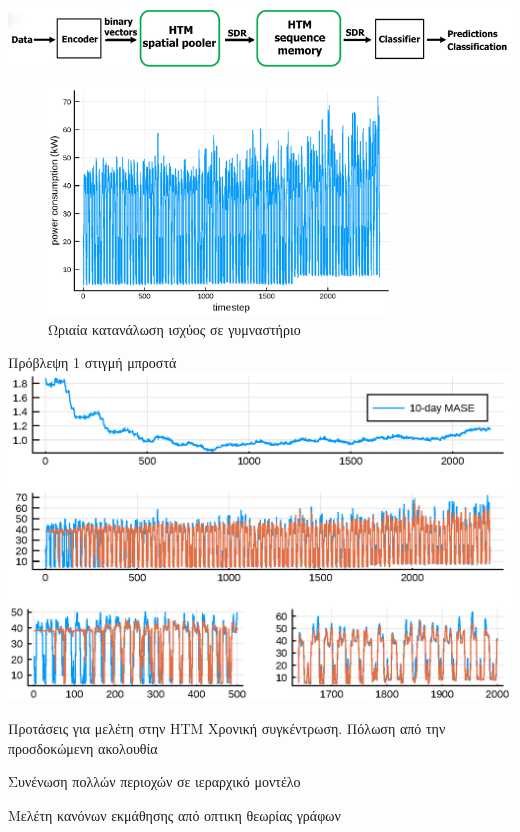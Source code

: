 \documentclass[10pt,lualatex]{beamer}
\begin{document}
\begin{frame}
  \centering
  \includegraphics[width=\textwidth]{../figures/htm_predict_pipeline}
  \pause
  \begin{figure}
    \includegraphics[width=\textwidth,height=6cm]{../figures/tshotgym}
    \caption{Ωριαία κατανάλωση ισχύος σε γυμναστήριο}
  \end{figure}
\end{frame}

\begin{frame}{Πρόβλεψη 1 στιγμή μπροστά}
  \centering
  \includegraphics[width=\textwidth]{../figures/tm1.eps}
\end{frame}

\begin{frame}{Προτάσεις για μελέτη στην HTM}
    \alert{Χρονική συγκέντρωση}. Πόλωση από την προσδοκώμενη ακολουθία \cite{hawkinsTheoryHowColumns2017}

    Συνένωση πολλών περιοχών σε \alert{ιεραρχικό μοντέλο} \cite{hawkinsFrameworkIntelligenceCortical2019}

		Μελέτη κανόνων εκμάθησης από οπτικη \alert{θεωρίας γράφων} \cite{kipouridisConvergenceNetworkSystems2019}
\end{frame}
\end{document}
